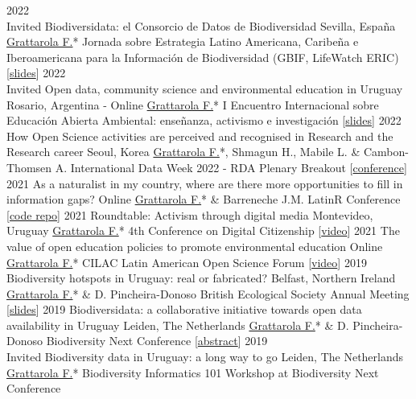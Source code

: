 \documentclass[9pt]{developercv} %
\begin{document}
\begin{entrylist}
	\entrylong
		{2022\\\footnotesize{Invited}}
		{Biodiversidata: el Consorcio de Datos de Biodiversidad}
		{Sevilla, España}
		{\underline{Grattarola F.}* \slashsep Jornada sobre Estrategia Latino Americana, Caribeña e Iberoamericana para la Información de Biodiversidad (GBIF, LifeWatch ERIC) [\href{https://flograttarola.com/pdf/Biodiversidata_Sevilla.pdf}{slides}]}
	\entrylong
		{2022\\\footnotesize{Invited}}
		{Open data, community science and environmental education in Uruguay}
		{Rosario, Argentina - Online}
		{\underline{Grattarola F.}* \slashsep I Encuentro Internacional sobre Educación Abierta Ambiental: enseñanza, activismo e investigación [\href{https://flograttarola.com/pdf/IEEAA_2022.pdf}{slides}]}
	\entrylong
		{2022}
		{How Open Science activities are perceived and recognised in Research and the Research career}
		{Seoul, Korea}
		{\underline{Grattarola F.}*, Shmagun H., Mabile L. \& Cambon-Thomsen A. \slashsep International Data Week 2022 - RDA Plenary Breakout [\href{https://www.idw2022.org}{conference}]}
	\entrylong
		{2021}
		{As a naturalist in my country, where are there more opportunities to fill in information gaps?}
		{Online}
		{\underline{Grattarola F.}* \& Barreneche J.M. \slashsep LatinR Conference [\href{https://github.com/bienflorencia/LatinR2021}{code repo}]}
	\entrylong
		{2021}
		{Roundtable: Activism through digital media}
		{Montevideo, Uruguay}
		{\underline{Grattarola F.}* \slashsep 4th Conference on Digital Citizenship [\href{https://youtu.be/NNA46QEZVQI}{video}]}
	\entrylong
		{2021}
		{The value of open education policies to promote environmental education}
		{Online}
		{\underline{Grattarola F.}* \slashsep CILAC Latin American Open Science Forum [\href{https://youtu.be/W6i6y87p2IM}{video}]}
	\entrylong
		{2019}
		{Biodiversity hotspots in Uruguay: real or fabricated?}
		{Belfast, Northern Ireland}
		{\underline{Grattarola F.}* \& D. Pincheira-Donoso \slashsep British Ecological Society Annual Meeting [\href{https://flograttarola.com/pdf/FGrattarola_BES2019_WEB.pdf}{slides}]}
	\entrylong
		{2019}
		{Biodiversidata: a collaborative initiative towards open data availability in Uruguay}
		{Leiden, The Netherlands}
		{\underline{Grattarola F.}* \& D. Pincheira-Donoso \slashsep Biodiversity Next Conference [\href{https://flograttarola.com/pdf/BISS_article_37715.pdf}{abstract}]}
	\entrylong
		{2019\\\footnotesize{Invited}}
		{Biodiversity data in Uruguay: a long way to go}
		{Leiden, The Netherlands}
		{\underline{Grattarola F.}* \slashsep Biodiversity Informatics 101 Workshop at Biodiversity Next Conference}

\end{entrylist}
\end{document}
